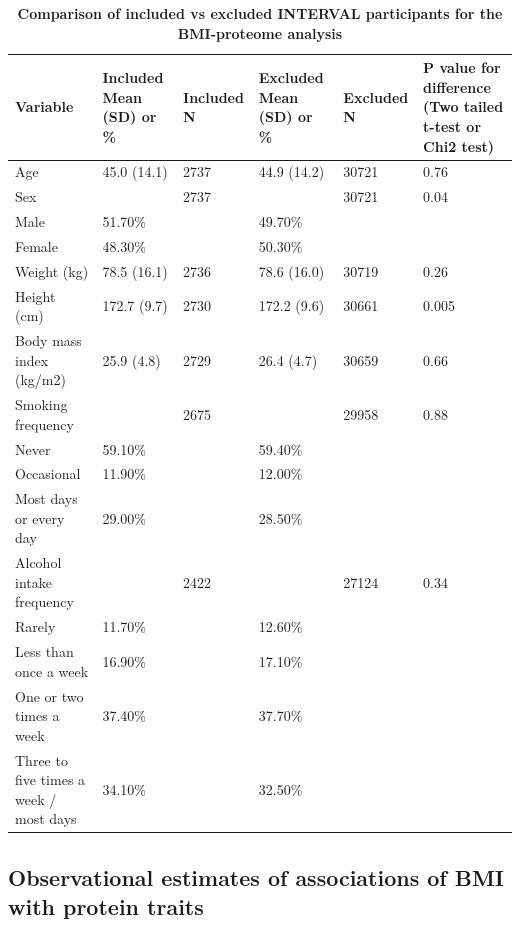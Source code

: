 \documentclass[11pt,twoside]{bristolthesis}
\begin{document}
\begin{landscape}\begin{table}

\caption[Comparison of included vs excluded INTERVAL participants for the BMI-proteome analysis]{\label{tab:Inc-excl-part}\textbf{Comparison of included vs excluded INTERVAL participants for the BMI-proteome analysis}}
\centering
\begin{tabu} to 
\toprule
Variable & Included Mean (SD) or \% & Included N & Excluded Mean (SD) or \% & Excluded N & P value for difference (Two tailed t-test or Chi2 test)\\
\midrule
Age & 45.0 (14.1) & 2737 & 44.9 (14.2) & 30721 & 0.76\\
Sex &  & 2737 &  & 30721 & 0.04\\
\hspace{1em}Male & 51.70\% &  & 49.70\% &  & \\
\hspace{1em}Female & 48.30\% &  & 50.30\% &  & \\
Weight (kg) & 78.5 (16.1) & 2736 & 78.6 (16.0) & 30719 & 0.26\\
\addlinespace
Height (cm) & 172.7 (9.7) & 2730 & 172.2 (9.6) & 30661 & 0.005\\
Body mass index (kg/m2) & 25.9 (4.8) & 2729 & 26.4 (4.7) & 30659 & 0.66\\
Smoking frequency &  & 2675 &  & 29958 & 0.88\\
\hspace{1em}Never & 59.10\% &  & 59.40\% &  & \\
\hspace{1em}Occasional & 11.90\% &  & 12.00\% &  & \\
\addlinespace
\hspace{1em}Most days or every day & 29.00\% &  & 28.50\% &  & \\
Alcohol intake frequency &  & 2422 &  & 27124 & 0.34\\
\hspace{1em}Rarely & 11.70\% &  & 12.60\% &  & \\
\hspace{1em}Less than once a week & 16.90\% &  & 17.10\% &  & \\
\hspace{1em}One or two times a week & 37.40\% &  & 37.70\% &  & \\
\addlinespace
\hspace{1em}Three to five times a week / most days & 34.10\% &  & 32.50\% &  & \\
\bottomrule
\end{tabu}
\end{table}
\end{landscape}
\hypertarget{observational-estimates-of-associations-of-bmi-with-protein-traits}{%
\subsection{Observational estimates of associations of BMI with protein traits}\label{observational-estimates-of-associations-of-bmi-with-protein-traits}}
\end{document}
